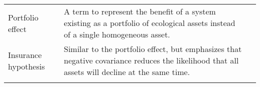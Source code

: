 \begin{small}
\begin{longtable}{>{\RaggedRight}p{3.6cm}>{\RaggedRight}p{7.3cm}>{\RaggedRight}p{3.6cm}}
Portfolio effect &
A term to represent the benefit of a system existing as a portfolio of ecological assets instead of a single homogeneous asset. &
\citep{tilman1998, schindler2010, thibaut2013, anderson2013}\\

Insurance hypothesis &
Similar to the portfolio effect, but emphasizes that negative covariance reduces the likelihood that all assets will decline at the same time. &
\citep{yachi1999,valone2008}\\

\bottomrule
\label{tab:theory}
\end{longtable}
\end{small}
